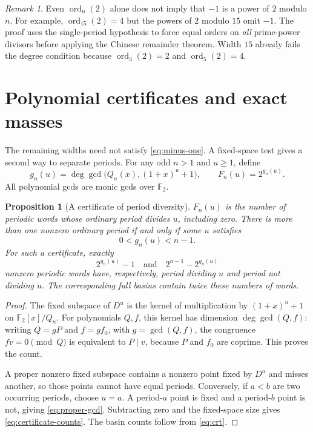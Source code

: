\documentclass[11pt]{article}
\newtheorem{proposition}[theorem]{Proposition}
\theoremstyle{definition}
\theoremstyle{remark}
\newtheorem{remark}[theorem]{Remark}
\numberwithin{equation}{section}
\newcommand{\F}{\mathbb F_2}
\DeclareMathOperator{\ord}{ord}
\begin{document}
\begin{remark}
Even $\ord_n(2)$ alone does not imply that $-1$ is a power of $2$
modulo $n$. For example, $\ord_{15}(2)=4$ but the powers of $2$
modulo $15$ omit $-1$. The proof uses the single-period hypothesis to
force equal orders on \emph{all} prime-power divisors before applying
the Chinese remainder theorem. Width $15$ already fails the degree
condition because $\ord_3(2)=2$ and $\ord_5(2)=4$.
\end{remark}

\section{Polynomial certificates and exact masses}\label{sec:certificates}

The remaining widths need not satisfy \eqref{eq:minus-one}. A fixed-space
test gives a second way to separate periods. For any odd $n>1$ and
$u\ge1$, define
\begin{equation}\label{eq:gcd-degree}
 g_n(u)=\deg\gcd\bigl(Q_n(x),(1+x)^u+1\bigr),
 \qquad F_n(u)=2^{g_n(u)}.
\end{equation}
All polynomial gcds are monic gcds over $\F$.

\begin{proposition}[A certificate of period diversity]\label{prop:certificate}
$F_n(u)$ is the number of periodic words whose ordinary period divides
$u$, including zero. There is more than one nonzero ordinary period
if and only if some $u$ satisfies
\begin{equation}\label{eq:proper-gcd}
 0<g_n(u)<n-1.
\end{equation}
For such a certificate, exactly
\begin{equation}\label{eq:certificate-counts}
 2^{g_n(u)}-1\quad\text{and}\quad 2^{n-1}-2^{g_n(u)}
\end{equation}
nonzero periodic words have, respectively, period dividing $u$ and
period not dividing $u$. The corresponding full basins contain twice
these numbers of words.
\end{proposition}

\begin{proof}
The fixed subspace of $D^u$ is the kernel of multiplication by
$(1+x)^u+1$ on $\F[x]/Q_n$. For polynomials $Q,f$, this kernel has
dimension $\deg\gcd(Q,f)$: writing $Q=gP$ and $f=gf_0$, with
$g=\gcd(Q,f)$, the congruence $fv=0\pmod Q$ is equivalent to
$P\mid v$, because $P$ and $f_0$ are coprime. This proves the count.

A proper nonzero fixed subspace contains a nonzero point fixed by $D^u$
and misses another, so those points cannot have equal periods. Conversely,
if $a<b$ are two occurring periods, choose $u=a$. A period-$a$ point is
fixed and a period-$b$ point is not, giving \eqref{eq:proper-gcd}.
Subtracting zero and the fixed-space size gives
\eqref{eq:certificate-counts}. The basin counts follow from
\eqref{eq:crt}.
\end{proof}
\end{document}
